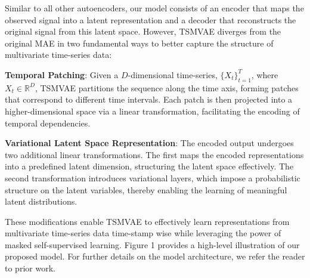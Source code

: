 \documentclass[12pt]{article} %
\begin{document}
Similar to all other autoencoders, our model consists of an encoder that maps the observed signal into a latent representation and a decoder that reconstructs the original signal from this latent space. However, TSMVAE diverges from the original MAE in two fundamental ways to better capture the structure of multivariate time-series data:

\textbf{Temporal Patching}: Given a $D$-dimensional time-series, $\{X_t\}_{t=1}^{T}$, where $X_t \in \mathbb{R}^D$, TSMVAE partitions the sequence along the time axis, forming patches that correspond to different time intervals. Each patch is then projected into a higher-dimensional space via a linear transformation, facilitating the encoding of temporal dependencies.

\textbf{Variational Latent Space Representation}: The encoded output undergoes two additional linear transformations. The first maps the encoded representations into a predefined latent dimension, structuring the latent space effectively. The second transformation introduces variational layers, which impose a probabilistic structure on the latent variables, thereby enabling the learning of meaningful latent distributions. 

These modifications enable TSMVAE to effectively learn representations from multivariate time-series data time-stamp wise while leveraging the power of masked self-supervised learning. Figure 1 provides a high-level illustration of our proposed model. For further details on the model architecture, we refer the reader to prior work.


%
%
%
%
\end{document}
